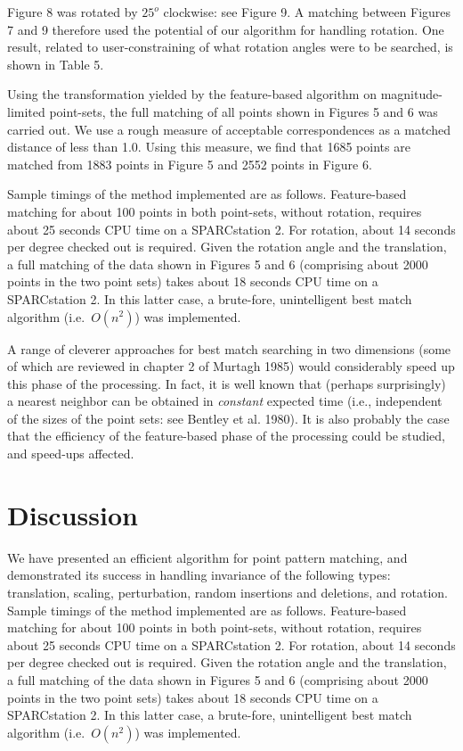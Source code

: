Figure 8 was rotated by $25^o$ clockwise: see Figure 9.  
A matching between Figures 7 
and 9 therefore used the potential of our algorithm for handling rotation.
One result, related to user-constraining of what rotation angles were to 
be searched, is shown in Table 5.

Using the transformation yielded by the feature-based 
algorithm on magn\-itude-limited 
point-sets, the full matching of all points shown in Figures 5 and 6 was 
carried out.  We use a rough measure of acceptable correspondences as a 
matched distance of less than 1.0.  Using this measure, we find that
1685 points are matched from 1883 points in Figure 5 and 2552 points in Figure 6.

Sample timings of the method implemented are as follows.  Feature-based 
matching for about 100 points in both point-sets, without rotation, 
requires about 25 seconds CPU time on a SPARCstation 2.  For rotation, about
14 seconds per degree checked out is required.  Given the rotation angle and
the translation, a full matching of the data shown in Figures 
5 and 6 (comprising
about 2000 points in the two point sets) takes about 18 seconds CPU time on
a SPARCstation 2.  In this latter case, a brute-fore, unintelligent
best match algorithm (i.e.\ $O(n^2)$) was 
implemented.  

A range of cleverer approaches for
best match searching in two dimensions (some of which are reviewed in chapter
2 of Murtagh 1985) would considerably speed up this phase of the processing.
In fact, it is well known that (perhaps surprisingly) a nearest neighbor 
can be obtained in {\it constant} expected time (i.e., independent of the
sizes of the point sets: see Bentley et al. 1980).
It is also probably the case that the efficiency of the 
feature-based phase of the
processing could be studied, and speed-ups affected.

\section{Discussion}

We have presented an efficient algorithm for point pattern matching,
and demonstrated its success in handling invariance of the following types:
translation, scaling, perturbation, random insertions and deletions, and 
rotation. Sample timings of the method implemented are as follows.  Feature-based 
matching for about 100 points in both point-sets, without rotation, 
requires about 25 seconds CPU time on a SPARCstation 2.  For rotation, about
14 seconds per degree checked out is required.  Given the rotation angle and
the translation, a full matching of the data shown in Figures 
5 and 6 (comprising
about 2000 points in the two point sets) takes about 18 seconds CPU time on
a SPARCstation 2.  In this latter case, a brute-fore, unintelligent
best match algorithm (i.e.\ $O(n^2)$) was 
implemented.  

